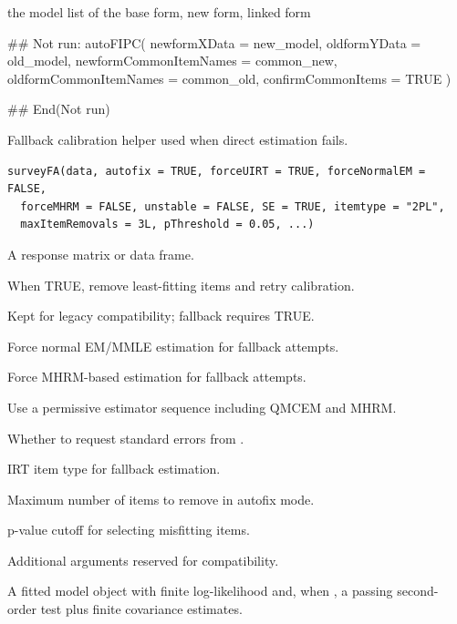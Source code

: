 \documentclass[letterpaper]{book}
\begin{document}
%
\begin{Value}
the model list of the base form, new form, linked form
\end{Value}
%
\begin{Examples}
\begin{ExampleCode}
## Not run:
autoFIPC(
  newformXData = new_model,
  oldformYData = old_model,
  newformCommonItemNames = common_new,
  oldformCommonItemNames = common_old,
  confirmCommonItems = TRUE
)

## End(Not run)
\end{ExampleCode}
\end{Examples}
%
\begin{Description}
Fallback calibration helper used when direct  estimation fails.
\end{Description}
%
\begin{Usage}
\begin{verbatim}
surveyFA(data, autofix = TRUE, forceUIRT = TRUE, forceNormalEM = FALSE,
  forceMHRM = FALSE, unstable = FALSE, SE = TRUE, itemtype = "2PL",
  maxItemRemovals = 3L, pThreshold = 0.05, ...)
\end{verbatim}
\end{Usage}
%
\begin{Arguments}
\begin{ldescription}
\item[\code{data}] A response matrix or data frame.
\item[\code{autofix}] When TRUE, remove least-fitting items and retry calibration.
\item[\code{forceUIRT}] Kept for legacy compatibility; fallback requires TRUE.
\item[\code{forceNormalEM}] Force normal EM/MMLE estimation for fallback attempts.
\item[\code{forceMHRM}] Force MHRM-based estimation for fallback attempts.
\item[\code{unstable}] Use a permissive estimator sequence including QMCEM and MHRM.
\item[\code{SE}] Whether to request standard errors from .
\item[\code{itemtype}] IRT item type for fallback estimation.
\item[\code{maxItemRemovals}] Maximum number of items to remove in autofix mode.
\item[\code{pThreshold}] p-value cutoff for selecting misfitting items.
\item[\code{...}] Additional arguments reserved for compatibility.
\end{ldescription}
\end{Arguments}
%
\begin{Value}
A fitted  model object with finite log-likelihood and, when
, a passing second-order test plus finite covariance estimates.
\end{Value}
\printindex{}
\end{document}
